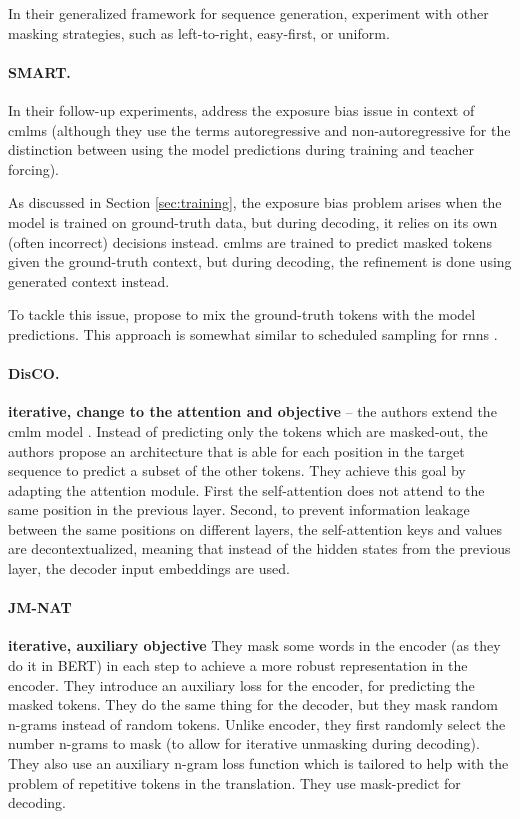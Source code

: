 In their generalized framework for sequence generation,
\citet{mansimov2019generalized} experiment with other masking strategies, such
as left-to-right, easy-first, or uniform.

\paragraph{SMART.} In their follow-up experiments,
\citet{ghazvininejad-etal-2020-semiautoregressive} address the exposure bias
issue in context of \acp{cmlm} (although they use the terms autoregressive and
non-autoregressive for the distinction between using the model predictions
during training and teacher forcing).

As discussed in Section \ref{sec:training}, the exposure bias problem arises
when the model is trained on ground-truth data, but during decoding, it relies
on its own (often incorrect) decisions instead. \Acp{cmlm} are trained to
predict masked tokens given the ground-truth context, but during decoding, the
refinement is done using generated context instead.

To tackle this issue, \citet{ghazvininejad-etal-2020-semiautoregressive}
propose to mix the ground-truth tokens with the model predictions. This
approach is somewhat similar to scheduled sampling for \aclp{rnn}
\citep{bengio2015scheduled}.

\paragraph{DisCO.} \textbf{iterative, change to the attention and objective}
\citep{kasai2020nonautoregressive} -- the authors extend the \ac{cmlm} model
\citep{ghazvininejad-etal-2019-mask}. Instead of predicting only the tokens
which are masked-out, the authors propose an architecture that is able for each
position in the target sequence to predict a subset of the other tokens. They
achieve this goal by adapting the attention module. First the self-attention
does not attend to the same position in the previous layer. Second, to prevent
information leakage between the same positions on different layers, the
self-attention keys and values are decontextualized, meaning that instead of
the hidden states from the previous layer, the decoder input embeddings are
used.

\paragraph{JM-NAT} \textbf{iterative, auxiliary objective}
\citep{guo-etal-2020-jointly} They mask some words in the encoder (as they do
it in BERT) in each step to achieve a more robust representation in the
encoder. They introduce an auxiliary loss for the encoder, for predicting the
masked tokens. They do the same thing for the decoder, but they mask random
n-grams instead of random tokens. Unlike encoder, they first randomly select
the number n-grams to mask (to allow for iterative unmasking during
decoding). They also use an auxiliary n-gram loss function which is tailored to
help with the problem of repetitive tokens in the translation. They use
mask-predict \citep{ghazvininejad-etal-2019-mask} for decoding.


